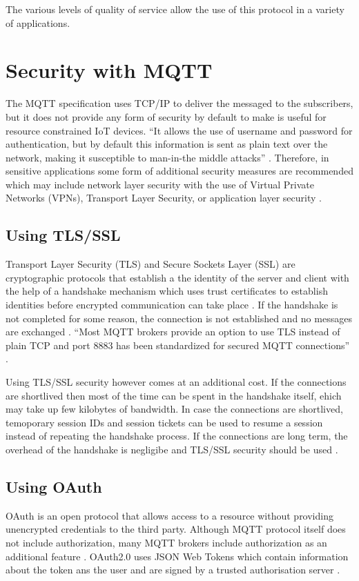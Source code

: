 \documentclass[sigconf]{acmart}
\begin{document}
The various levels of quality of service allow the use of this protocol in a variety of applications.

\section{Security with MQTT}
The MQTT specification uses TCP/IP to deliver the messaged to the subscribers, but it does not provide any form of security by default to make is useful for resource constrained IoT devices. ``It allows the use of username and password for authentication, but by default this information is sent as plain text over the network, making it susceptible to man-in-the middle attacks'' \cite{iot-design-mqtt-security} \cite{mqtt-sec-ssl}. Therefore, in sensitive applications some form of additional security measures are recommended which may include network layer security with the use of Virtual Private Networks (VPNs), Transport Layer Security, or application layer security \cite{mqtt-sec-ssl}. 

\subsection{Using TLS/SSL}
Transport Layer Security (TLS) and Secure Sockets Layer (SSL) are cryptographic protocols that establish a the identity of the server and client with the help of a handshake mechanism which uses trust certificates to establish identities before encrypted communication can take place \cite{ibm-mqtt-security}. If the handshake is not completed for some reason, the connection is not established and no messages are exchanged \cite{mqtt-sec-ssl}. ``Most MQTT brokers provide an option to use TLS instead of plain TCP and port 8883 has been standardized for secured MQTT connections'' \cite{iot-design-mqtt-security}.

Using TLS/SSL security however comes at an additional cost. If the connections are shortlived then most of the time can be spent in the handshake itself, ehich may take up few kilobytes of bandwidth. In case the connections are shortlived, temoporary session IDs and session tickets can be used to resume a session instead of repeating the handshake process. If the connections are long term, the overhead of the handshake is negligibe and TLS/SSL security should be used \cite{iot-design-mqtt-security}\cite{mqtt-sec-ssl}.

\subsection{Using OAuth}
OAuth is an open protocol that allows access to a resource without providing unencrypted credentials to the third party. Although MQTT protocol itself does not include authorization, many MQTT brokers include authorization as an additional feature \cite{ibm-mqtt-security}. OAuth2.0 uses JSON Web Tokens which contain information about the token ans the user and are signed by a trusted authorisation server \cite{hivemq-security-oauth}.
\end{document}
